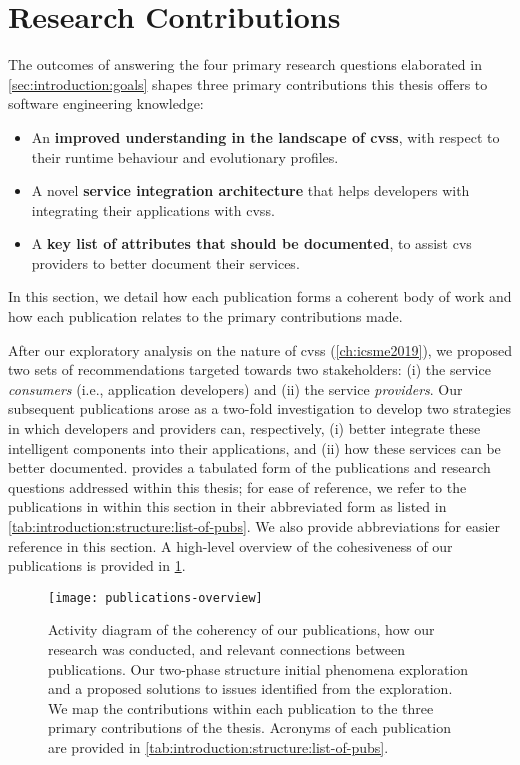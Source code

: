 \section{Research Contributions}
\label{sec:introduction:research-contributions}

The outcomes of answering the four primary research questions elaborated in \cref{sec:introduction:goals} shapes three primary contributions this thesis offers to software engineering knowledge:

\begin{itemize}
  \item An \textbf{improved understanding in the landscape of \glspl{cvs}}, with respect to their runtime behaviour and evolutionary profiles. 
  \item A novel \textbf{service integration architecture} that helps developers with integrating their applications with \glspl{cvs}.
  \item A \textbf{key list of attributes that should be documented}, to assist \gls{cvs} providers to better document their services.
\end{itemize}

In this section, we detail how each publication forms a coherent body of work and how each publication relates to the primary contributions made.

After our exploratory analysis on the nature of \glspl{cvs} (\cref{ch:icsme2019}), we proposed two sets of recommendations targeted towards two stakeholders: (i) the service \textit{consumers} (i.e., application developers) and (ii) the service \textit{providers}. Our subsequent publications arose as a two-fold investigation to develop two strategies in which developers and providers can, respectively, (i) better integrate these intelligent components into their applications, and (ii) how these services can be better documented.  provides a tabulated form of the publications and research questions addressed within this thesis; for ease of reference, we refer to the publications in within this section in their abbreviated form as listed in \cref{tab:introduction:structure:list-of-pubs}. We also provide abbreviations for easier reference in this section. A high-level overview of the cohesiveness of our publications is provided in \cref{fig:introduction:structure:publications-overview}.

\begin{figure}[hbt]
  \texttt{[image: publications-overview]}
  \caption[Overview publication coherency]{Activity diagram of the coherency of our publications, how our research was conducted, and relevant connections between publications. Our two-phase structure initial phenomena exploration and a proposed solutions to issues identified from the exploration. We map the contributions within each publication to the three primary contributions of the thesis. Acronyms of each publication are provided in \cref{tab:introduction:structure:list-of-pubs}.}
  \label{fig:introduction:structure:publications-overview}
\end{figure}

